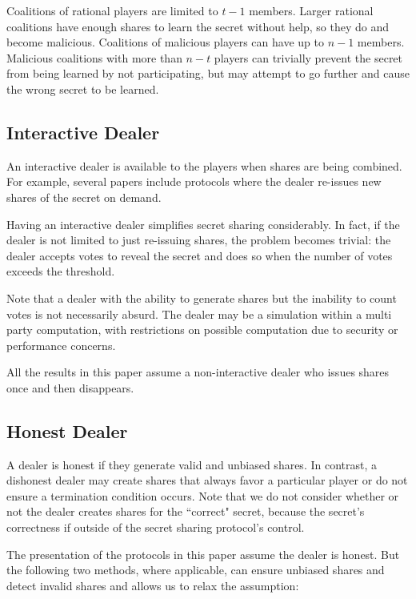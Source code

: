 \documentclass{dalcsthesis}
\begin{document}
Coalitions of rational players are limited to $t-1$ members. Larger rational coalitions have enough shares to learn the secret without help, so they do and become malicious. Coalitions of malicious players can have up to $n-1$ members. Malicious coalitions with more than $n-t$ players can trivially prevent the secret from being learned by not participating, but may attempt to go further and cause the wrong secret to be learned.

\subsection{Interactive Dealer}

An interactive dealer is available to the players when shares are being combined. For example, several papers \cite{halpern04, gordon06, maleka08} include protocols where the dealer re-issues new shares of the secret on demand.

Having an interactive dealer simplifies secret sharing considerably. In fact, if the dealer is not limited to just re-issuing shares, the problem becomes trivial: the dealer accepts votes to reveal the secret and does so when the number of votes exceeds the threshold.

Note that a dealer with the ability to generate shares but the inability to count votes is not necessarily absurd. The dealer may be a simulation within a multi party computation, with restrictions on possible computation due to security or performance concerns.

All the results in this paper assume a non-interactive dealer who issues shares once and then disappears.

\subsection{Honest Dealer}

A dealer is honest if they generate valid and unbiased shares. In contrast, a dishonest dealer may create shares that always favor a particular player or do not ensure a termination condition occurs. Note that we do not consider whether or not the dealer creates shares for the ``correct" secret, because the secret's correctness if outside of the secret sharing protocol's control.

The presentation of the protocols in this paper assume the dealer is honest. But the following two methods, where applicable, can ensure unbiased shares and detect invalid shares and allows us to relax the assumption:
\end{document}
